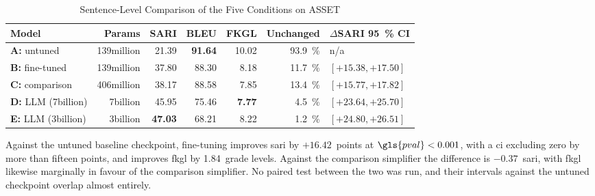 \begin{table}[htbp]
	\centering
	\footnotesize
	\setlength{\tabcolsep}{4.5pt}
	\caption{Sentence-Level Comparison of the Five Conditions on ASSET}
	\label{tab:s6}
	\begin{tabular}{@{}lrrrrrl@{}}
		\toprule
		\textbf{Model}                   & \textbf{Params}  & \textbf{SARI}        & \textbf{BLEU}        & \textbf{FKGL}       & \textbf{Unchanged}   & \textbf{\(\Delta\)SARI \qty{95}{\percent} CI} \\
		\midrule
		\textbf{A:} untuned              & 139\gls{million} & \num{21.39}          & \textbf{\num{91.64}} & \num{10.02}         & \qty{93.9}{\percent} & n/a                                           \\
		\textbf{B:} fine-tuned           & 139\gls{million} & \num{37.80}          & \num{88.30}          & \num{8.18}          & \qty{11.7}{\percent} & \([+15.38, +17.50]\)                          \\
		\textbf{C:} comparison           & 406\gls{million} & \num{38.17}          & \num{88.58}          & \num{7.85}          & \qty{13.4}{\percent} & \([+15.77, +17.82]\)                          \\
		\textbf{D:} LLM (7\gls{billion}) & 7\gls{billion}   & \num{45.95}          & \num{75.46}          & \textbf{\num{7.77}} & \qty{4.5}{\percent}  & \([+23.64, +25.70]\)                          \\
		\textbf{E:} LLM (3\gls{billion}) & 3\gls{billion}   & \textbf{\num{47.03}} & \num{68.21}          & \num{8.22}          & \qty{1.2}{\percent}  & \([+24.80, +26.51]\)                          \\
		\bottomrule
	\end{tabular}
\end{table}

Against the untuned baseline checkpoint, fine-tuning improves \gls{sari} by \(+16.42\)~points at \(\gls{pval} < 0.001\), with a \gls{ci} excluding zero by more than fifteen points, and improves \gls{fkgl} by \num{1.84}~grade levels.
Against the comparison simplifier the difference is \(-0.37\)~\gls{sari}, with \gls{fkgl} likewise marginally in favour of the comparison simplifier.
No paired test between the two was run, and their intervals against the untuned checkpoint overlap almost entirely.

